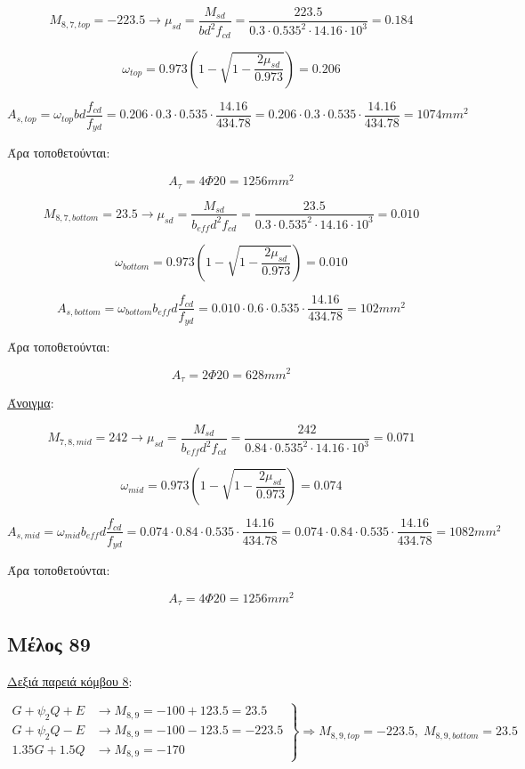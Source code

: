 \[
M_{8,7,top} = -223.5 \rightarrow \mu_{sd} = \dfrac{M_{sd}}{b d^2 f_{cd}} = \dfrac{223.5}{0.3\cdot0.535^2\cdot14.16\cdot10^3} = 0.184
\]

\[
\omega_{top} = 0.973\left( 1 - \sqrt{1 - \dfrac{2\mu_{sd}}{0.973}} \right) = 0.206
\]

\[
A_{s,top} = \omega_{top}b d \dfrac{f_{cd}}{f_{yd}} = 0.206\cdot 0.3 \cdot 0.535 \cdot \dfrac{14.16}{434.78} = 0.206\cdot 0.3 \cdot 0.535 \cdot \dfrac{14.16}{434.78} = 1074mm^2
\]

\noindent
Άρα τοποθετούνται:

\[
A_{\tau} = 4\Phi20 = 1256mm^2
\]

\[
M_{8,7,bottom} = 23.5 \rightarrow \mu_{sd} = \dfrac{M_{sd}}{b_{eff} d^2 f_{cd}} = \dfrac{23.5}{0.3\cdot0.535^2\cdot14.16\cdot10^3} = 0.010
\]

\[
\omega_{bottom} = 0.973\left( 1 - \sqrt{1 - \dfrac{2\mu_{sd}}{0.973}} \right) = 0.010
\]

\[
A_{s,bottom} = \omega_{bottom}b_{eff} d \dfrac{f_{cd}}{f_{yd}} = 0.010\cdot 0.6 \cdot 0.535 \cdot \dfrac{14.16}{434.78} = 102mm^2
\]

\noindent
Άρα τοποθετούνται:

\[
A_{\tau} = 2\Phi20 = 628mm^2
\]

\noindent
\underline{Άνοιγμα}:

\bigskip

\[
M_{7,8,mid} = 242 \rightarrow \mu_{sd} = \dfrac{M_{sd}}{b_{eff} d^2 f_{cd}} = \dfrac{242}{0.84\cdot0.535^2\cdot14.16\cdot10^3} = 0.071
\]

\[
\omega_{mid} = 0.973\left( 1 - \sqrt{1 - \dfrac{2\mu_{sd}}{0.973}} \right) = 0.074
\]

\[
A_{s,mid} = \omega_{mid}b_{eff} d \dfrac{f_{cd}}{f_{yd}} = 0.074\cdot 0.84 \cdot 0.535 \cdot \dfrac{14.16}{434.78} = 0.074\cdot 0.84 \cdot 0.535 \cdot \dfrac{14.16}{434.78} = 1082 mm^2
\]

\noindent
Άρα τοποθετούνται:

\[
A_{\tau} = 4\Phi20 = 1256 mm^2
\]

\subsection{Μέλος 89}

\noindent
\underline{Δεξιά παρειά κόμβου 8}:

\[
\left.
   \begin{array}{ll}
       G+\psi_2 Q + Ε & \rightarrow M_{8,9} = -100+123.5 = 23.5 \\
       G+\psi_2 Q - Ε & \rightarrow M_{8,9} = -100-123.5 = -223.5 \\
       1.35G + 1.5Q     & \rightarrow M_{8,9} = -170
   \end{array}
\right \} \Rightarrow M_{8,9,top} = -223.5,\; M_{8,9,bottom} = 23.5
\]

